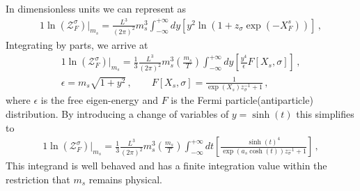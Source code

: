 In dimensionless units we can represent  as
\begin{alignat}{1}
    \label{FreelikeAlt} \ln\left(\mathcal{Z}^{\sigma}_{F}\right)|_{m_{s}}=\frac{L^{3}}{(2\pi)^{2}}m_{s}^{3}\int^{+\infty}_{-\infty}dy\left[y^{2}\ln\left(1+z_{\sigma}\exp(-X^{s}_{F})\right)\right]\,,
\end{alignat}
Integrating by parts, we arrive at
\begin{gather}{1}
    \label{FreelikeParts} \ln\left(\mathcal{Z}^{\sigma}_{F}\right)|_{m_{s}}=\frac{1}{3}\frac{L^{3}}{(2\pi)^{2}}m_{s}^{3}\left(\frac{m_{s}}{T}\right)\int^{+\infty}_{-\infty}dy\left[\frac{y^{4}}{\epsilon}F[X_{s},\sigma]\right]\,,\\
    \label{FermD}
    \epsilon=m_{s}\sqrt{1+y^{2}}\,,\qquad
    F[X_{s},\sigma] = \frac{1}{\exp(X_{s})z_{\sigma}^{-1}+1}\,,
\end{gather}
where $\epsilon$ is the free eigen-energy and $F$ is the Fermi particle(antiparticle) distribution. By introducing a change of variables of $y=\sinh(t)$ this simplifies to
\begin{alignat}{1}
    \label{FreelikeFinal} \ln\left(\mathcal{Z}^{\sigma}_{F}\right)|_{m_{s}}=\frac{1}{3}\frac{L^{3}}{(2\pi)^{2}}m_{s}^{3}\left(\frac{m_{s}}{T}\right)\int^{+\infty}_{-\infty}dt\left[\frac{\sinh(t)^{4}}{\exp(a_{s}\cosh(t))z_{\sigma}^{-1}+1}\right]\,,
\end{alignat}
This integrand is well behaved and has a finite integration value within the restriction that $m_{s}$ remains physical.

